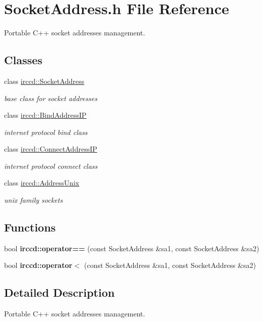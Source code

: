 \hypertarget{a00141}{\section{Socket\-Address.\-h File Reference}
\label{a00141}
}


Portable C++ socket addresses management.  


\subsection*{Classes}
\begin{DoxyCompactItemize}
\item 
class \hyperlink{a00063}{irccd\-::\-Socket\-Address}
\begin{DoxyCompactList}\small\item\em base class for socket addresses \end{DoxyCompactList}\item 
class \hyperlink{a00003}{irccd\-::\-Bind\-Address\-I\-P}
\begin{DoxyCompactList}\small\item\em internet protocol bind class \end{DoxyCompactList}\item 
class \hyperlink{a00006}{irccd\-::\-Connect\-Address\-I\-P}
\begin{DoxyCompactList}\small\item\em internet protocol connect class \end{DoxyCompactList}\item 
class \hyperlink{a00001}{irccd\-::\-Address\-Unix}
\begin{DoxyCompactList}\small\item\em unix family sockets \end{DoxyCompactList}\end{DoxyCompactItemize}
\subsection*{Functions}
\begin{DoxyCompactItemize}
\item 
bool {\bfseries irccd\-::operator==} (const Socket\-Address \&sa1, const Socket\-Address \&sa2)
\item 
bool {\bfseries irccd\-::operator$<$} (const Socket\-Address \&sa1, const Socket\-Address \&sa2)
\end{DoxyCompactItemize}


\subsection{Detailed Description}
Portable C++ socket addresses management. 